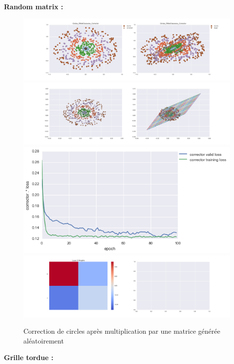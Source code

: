 {\Large \textbf{Random matrix :}}

\begin{figure}[H] %
\centering
\includegraphics[width=\linewidth]{fig/24-05-2016/circles/Circles_RMatClasswise_Corrector-DATA.png}
\includegraphics[width=\linewidth]{fig/24-05-2016/circles/Circles_RMatClasswise_Corrector-GridCheck.png}
\includegraphics[width=0.45\linewidth]{fig/24-05-2016/circles/Circles_RMatClasswise_Corrector-Learning_curve.png}
\includegraphics[width=\linewidth]{fig/24-05-2016/circles/Circles_RMatClasswise_Corrector-W.png}
\caption{Correction de circles après multiplication par une matrice générée aléatoirement}
\label{fig:recap-circles-RMat-classwise}
\end{figure}

{\Large \textbf{Grille tordue :}}

